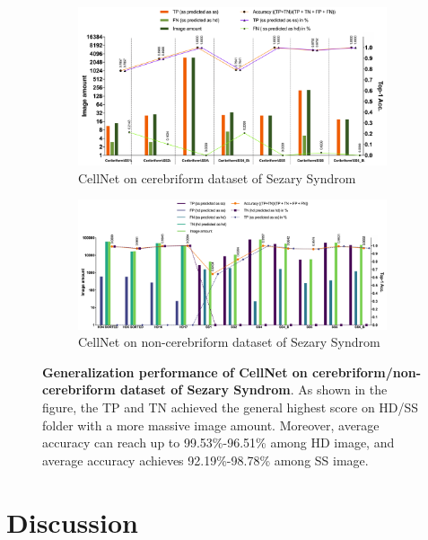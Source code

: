 \begin{figure}[h]		
	\begin{center}
		\begin{subfigure}[b]{\textwidth}
			\includegraphics[width=\textwidth]{thesis-template-master/images/Ceribriform.jpg}
			\caption{CellNet on cerebriform dataset of Sezary Syndrom }
			\label{fig:res18}
		\end{subfigure}
		\begin{subfigure}[b]{\textwidth}
		    \centering
			\includegraphics[width=\textwidth]{thesis-template-master/images/Non-ceribriform.jpg}
			\caption{CellNet on non-cerebriform dataset of Sezary Syndrom }
			\label{fig:cellnet}
		\end{subfigure}
	\end{center}
\caption{\textbf{Generalization performance of CellNet on cerebriform/non-cerebriform dataset of Sezary Syndrom}. As shown in the figure, the TP and TN achieved the general highest score on HD/SS folder with a more massive image amount. Moreover, average accuracy can reach up to 99.53\%-96.51\% among HD image, and average accuracy achieves 92.19\%-98.78\% among SS image.}
\label{fig:5.3}
\end{figure}





\chapter{Discussion}
\label{sec:examples}


